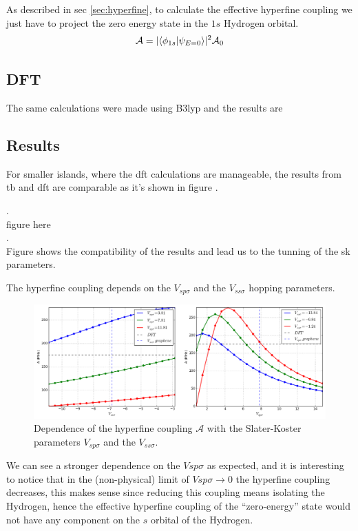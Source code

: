 As described in sec \ref{sec:hyperfine}, to calculate the effective hyperfine coupling we just have to project the zero energy state in the $1s$ Hydrogen orbital.
\begin{equation}
\mathcal{A} = |\langle\phi_{1s}|\psi_{E=0}\rangle|^{2}\mathcal{A}_{0}
\end{equation}




\subsection{DFT}
The same calculations were made using B3lyp and the results are \\


\subsection{Results}
For smaller islands, where the \ac{dft} calculations are manageable, the results from \ac{tb} and \ac{dft} are comparable as it's shown in figure .

.\\

figure here\\

.\\

Figure  shows the compatibility of the results and lead us to the tunning of the \ac{sk} parameters.

The hyperfine coupling depends on the $V_{sp\sigma}$ and the $V_{ss\sigma}$ hopping parameters.
\begin{figure}[h!]
\centering
\includegraphics{chapter05/figures/hf_SK.png}
\vspace{-5pt}
\caption{Dependence of the hyperfine coupling $\mathcal{A}$ with the Slater-Koster parameters $V_{sp\sigma}$ and the $V_{ss\sigma}$.}
\label{hf_SK}
\end{figure}
\FloatBarrier
We can see a stronger dependence on the $Vsp\sigma$ as expected, and it is interesting to notice that in the (non-physical) limit of $Vsp\sigma\rightarrow0$ the hyperfine coupling decreases, this makes sense since reducing this coupling means isolating the Hydrogen, hence the effective hyperfine coupling of the ``zero-energy'' state would not have any component on the $s$ orbital of the Hydrogen.


